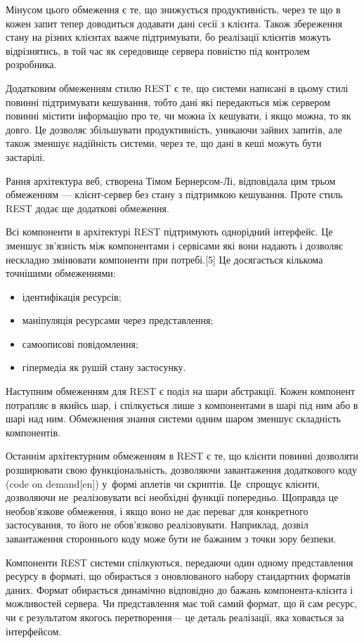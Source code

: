 \documentclass[../main.tex]{subfiles}
\begin{document}
Мінусом цього обмеження є те, що знижується продуктивність, через те що в кожен запит тепер доводиться додавати дані сесії з клієнта. Також збереження стану на різних клієнтах важче підтримувати, бо реалізації клієнтів можуть відрізнятись, в той час як середовище сервера повністю під контролем розробника.

Додатковим обмеженням стилю REST є те, що системи написані в цьому стилі повинні підтримувати кешування, тобто дані які передаються між сервером %
повинні містити інформацію про те, чи можна їх кешувати, і якщо можна, то як довго. Це дозволяє збільшувати продуктивність, уникаючи зайвих запитів, але також зменшує надійність системи, через те, що дані в кеші можуть бути застарілі.

Рання архітектура веб, створена Тімом Бернерсом-Лі, відповідала цим трьом обмеженням — клієнт-сервер без стану з підтримкою кешування. Проте стиль REST додає ще додаткові обмеження.

Всі компоненти в архітектурі REST підтримують однорідний інтерфейс. Це зменшує зв'язність між компонентами і сервісами які вони надають і дозволяє нескладно змінювати компоненти при потребі.[5] Це досягається кількома точнішими обмеженнями:

\begin{itemize}
	\item ідентифікація ресурсів;
	\item маніпуляція ресурсами через представлення;
	\item самоописові повідомлення;
	\item гіпермедіа як рушій стану застосунку.
\end{itemize}

Наступним обмеженням для REST є поділ на шари абстракції. Кожен компонент потрапляє в якийсь шар, і спілкується лише з компонентами в шарі під ним або в шарі над ним. Обмежнення знання системи одним шаром зменшує складність компонентів.

Останнім архітектурним обмеженням в REST є те, що клієнти повинні дозволяти розширювати свою функціональність, дозволяючи завантаження додаткового коду (code on demand[en]) у~формі аплетів чи скриптів. Це~спрощує клієнти, дозволяючи не~реалізовувати всі необхідні функції попередньо. Щоправда це необов'язкове обмеження, і якщо воно не дає переваг для конкретного застосування, то його не обов'язково реалізовувати. Наприклад, дозвіл завантаження стороннього коду може бути не бажаним з точки зору безпеки.

Компоненти REST системи спілкуються, передаючи один одному представлення ресурсу в форматі, що обирається з оновлюваного набору стандартних форматів даних. Формат обирається динамічно відповідно до бажань компонента-клієнта і можливостей сервера. Чи представлення має той самий формат, що й сам ресурс, чи є результатом якогось перетворення\nolinebreak[2] — це деталь реалізації, яка ховається за інтерфейсом.
\end{document}
